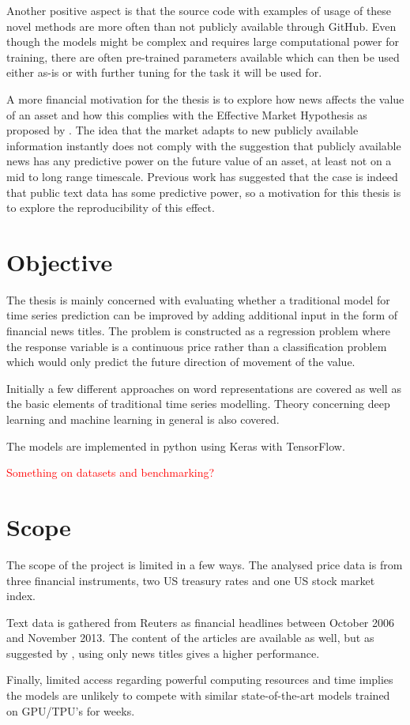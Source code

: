 Another positive aspect is that the source code with examples of usage of these novel methods are more often than not publicly available through GitHub. Even though the models might be complex and requires large computational power for training, there are often pre-trained parameters available which can then be used either as-is or with further tuning for the task it will be used for. 

A more financial motivation for the thesis is to explore how news affects the value of an asset and how this complies with the Effective Market Hypothesis as proposed by \citet{malkiel1970efficient}. The idea that the market adapts to new publicly available information instantly does not comply with the suggestion that publicly available news has any predictive power on the future value of an asset, at least not on a mid to long range timescale. Previous work has suggested that the case is indeed that public text data has some predictive power, so a motivation for this thesis is to explore the reproducibility of this effect.

\section{Objective}

The thesis is mainly concerned with evaluating whether a traditional model for time series prediction can be improved by adding additional input in the form of financial news titles. The problem is constructed as a regression problem where the response variable is a continuous price rather than a classification problem which would only predict the future direction of movement of the value. 

Initially a few different approaches on word representations are covered as well as the basic elements of traditional time series modelling. Theory concerning deep learning and machine learning in general is also covered. 

The models are implemented in python using Keras with TensorFlow. 

\textcolor{red}{Something on datasets and benchmarking?}

\section{Scope}
    
The scope of the project is limited in a few ways. The analysed price data is from three financial instruments, two US treasury rates and one US stock market index. 

Text data is gathered from Reuters as financial headlines between October 2006 and November 2013. The content of the articles are available as well, but as suggested by \citet{ding2014using}, using only news titles gives a higher performance. 

Finally, limited access regarding powerful computing resources and time implies the models are unlikely to compete with similar state-of-the-art models trained on GPU/TPU's for weeks. 










